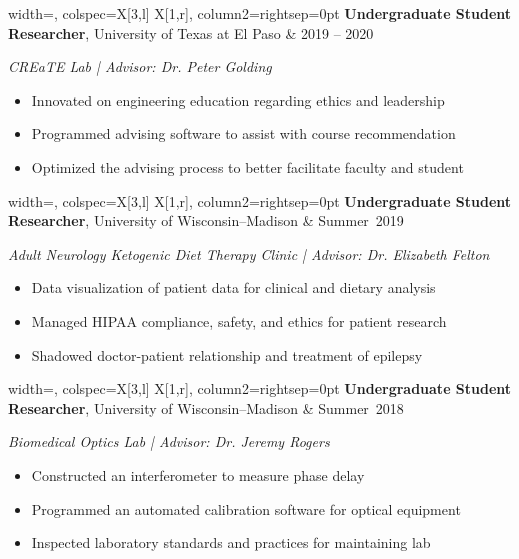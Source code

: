 \documentclass[12pt]{article}
\begin{document}
\noindent\begin{tblr}{
  width=\textwidth,
  colspec={X[3,l] X[1,r]},
  column{2}={rightsep=0pt}
}
\textbf{Undergraduate Student Researcher}, University of Texas at El Paso & 2019 -- 2020\\
\end{tblr}
\vspace{0.6ex}
\textit{CREaTE Lab \;|\; Advisor: Dr. Peter Golding}
\begin{itemize}
  \item Innovated on engineering education regarding ethics and leadership
  \item Programmed advising software to assist with course recommendation
  \item Optimized the advising process to better facilitate faculty and student
\end{itemize}

\noindent\begin{tblr}{
  width=\textwidth,
  colspec={X[3,l] X[1,r]},
  column{2}={rightsep=0pt}
}
\textbf{Undergraduate Student Researcher}, University of Wisconsin--Madison & Summer~2019\\
\end{tblr}
\vspace{0.6ex}
\textit{Adult Neurology Ketogenic Diet Therapy Clinic \;|\; Advisor: Dr. Elizabeth Felton}
\begin{itemize}
  \item Data visualization of patient data for clinical and dietary analysis
  \item Managed HIPAA compliance, safety, and ethics for patient research
  \item Shadowed doctor-patient relationship and treatment of epilepsy
\end{itemize}

\noindent\begin{tblr}{
  width=\textwidth,
  colspec={X[3,l] X[1,r]},
  column{2}={rightsep=0pt}
}
\textbf{Undergraduate Student Researcher}, University of Wisconsin--Madison & Summer~2018\\
\end{tblr}
\vspace{0.6ex}
\textit{Biomedical Optics Lab \;|\; Advisor: Dr. Jeremy Rogers}
\begin{itemize}
  \item Constructed an interferometer to measure phase delay
  \item Programmed an automated calibration software for optical equipment
  \item Inspected laboratory standards and practices for maintaining lab
\end{itemize}
\end{document}
